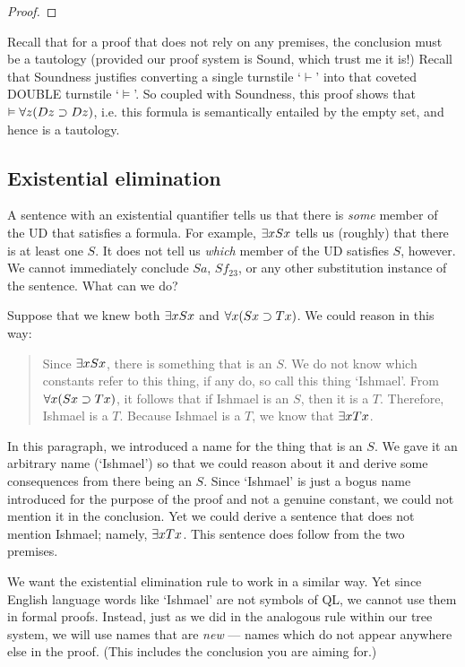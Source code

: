 \begin{proof}
	\open
	\close
\end{proof}

{\color{black}Recall that for a proof that does not rely on any premises, the conclusion must be a tautology (provided our proof system is Sound, which trust me it is!) Recall that Soundness justifies converting a single turnstile `$\vdash$' into that coveted DOUBLE turnstile `$\models$'. So coupled with Soundness, this proof shows that $\vDash \forall z(Dz \supset Dz)$, i.e. this formula is semantically entailed by the empty set, and hence is a tautology.}

\subsection{Existential elimination}
A sentence with an existential quantifier tells us that there is \emph{some} member of the UD that satisfies a formula. For example, $\exists x Sx$ tells us (roughly) that there is at least one $S$. It does not tell us \emph{which} member of the UD satisfies $S$, however. We cannot immediately conclude $Sa$, $Sf_{23}$, or any other substitution instance of the sentence. What can we do?

Suppose that we knew both $\exists x Sx$ and $\forall x(Sx \supset Tx)$. We could reason in this way:
\begin{quote}
Since $\exists x Sx$, there is something that is an $S$. We do not know which constants refer to this thing, if any do, so call this thing `Ishmael'. From $\forall x(Sx \supset Tx)$, it follows that if Ishmael is an $S$, then it is a $T$. Therefore, Ishmael is a $T$.  Because Ishmael is a $T$, we know that $\exists x Tx$.
\end{quote}
In this paragraph, we introduced a name for the thing that is an $S$. We gave it an arbitrary name (`Ishmael') so that we could reason about it and derive some consequences from there being an $S$. Since `Ishmael' is just a bogus name introduced for the purpose of the proof and not a genuine constant, we could not mention it in the conclusion. Yet we could derive a sentence that does not mention Ishmael; namely, $\exists x Tx$. This sentence does follow from the two premises.

We want the existential elimination rule to work in a similar way. Yet since English language words like `Ishmael' are not symbols of QL, we cannot use them in formal proofs. Instead, just as we did in the analogous rule within our tree system, we will use names that are \emph{new} --- names which do not appear anywhere else in the proof. (This includes the conclusion you are aiming for.)

